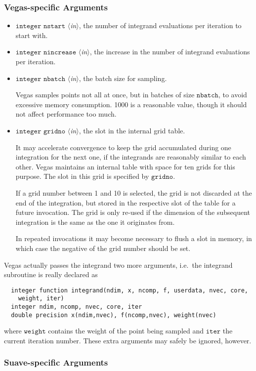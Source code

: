 \documentclass[12pt]{article}
\newcommand\ie{i.e.\ }
\newcommand\Code[1]{\ensuremath{\texttt{#1}}}
\newcommand\VarIn[1]{\item\Code{#1} \textit{$\langle$in\/$\rangle$},}
\begin{document}
\subsubsection{Vegas-specific Arguments}
\label{sect:vegasargs}

\begin{itemize}
\VarIn{integer nstart}
the number of integrand evaluations per iteration to start with.

\VarIn{integer nincrease}
the increase in the number of integrand evaluations per iteration.

\VarIn{integer nbatch}
the batch size for sampling.

Vegas samples points not all at once, but in batches of size
\Code{nbatch}, to avoid excessive memory consumption.  1000 is a
reasonable value, though it should not affect performance too much.

\VarIn{integer gridno}
the slot in the internal grid table.

It may accelerate convergence to keep the grid accumulated during one
integration for the next one, if the integrands are reasonably similar 
to each other.  Vegas maintains an internal table with space for ten
grids for this purpose.  The slot in this grid is specified by
\Code{gridno}.

If a grid number between 1 and 10 is selected, the grid is not discarded
at the end of the integration, but stored in the respective slot of the 
table for a future invocation.  The grid is only re-used if the 
dimension of the subsequent integration is the same as the one it 
originates from.

In repeated invocations it may become necessary to flush a slot in
memory, in which case the negative of the grid number should be set.
\end{itemize}

Vegas actually passes the integrand two more arguments, \ie the 
integrand subroutine is really declared as
\begin{verbatim}
  integer function integrand(ndim, x, ncomp, f, userdata, nvec, core,
    weight, iter)
  integer ndim, ncomp, nvec, core, iter
  double precision x(ndim,nvec), f(ncomp,nvec), weight(nvec)
\end{verbatim}
where \Code{weight} contains the weight of the point being sampled and
\Code{iter} the current iteration number.  These extra arguments may
safely be ignored, however.


\subsubsection{Suave-specific Arguments}
\end{document}
